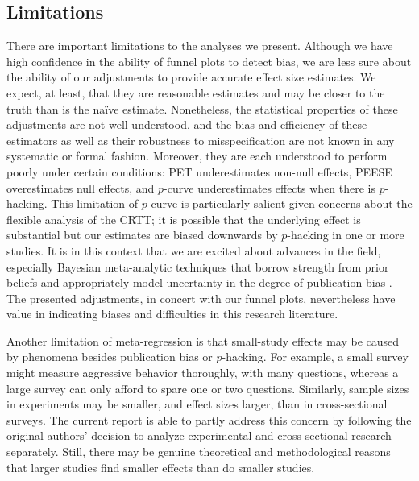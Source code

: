\documentclass[man, mask]{apa6}
\begin{document}
\subsection{Limitations}
There are important limitations to the analyses we present.  Although we have high confidence in the ability of funnel plots to detect bias, we are less sure about the ability of our adjustments to provide accurate effect size estimates.  We expect, at least, that they are reasonable estimates and may be closer to the truth than is the na{\"i}ve estimate.  Nonetheless, the statistical properties of these adjustments are not well understood, and the bias and efficiency of these estimators as well as their robustness to misspecification are not known in any systematic or formal fashion.  Moreover, they are each understood to perform poorly under certain conditions: PET underestimates non-null effects, PEESE overestimates null effects, and $p$-curve underestimates effects when there is $p$-hacking. This limitation of $p$-curve is particularly salient given concerns about the flexible analysis of the CRTT; it is possible that the underlying effect is substantial but our estimates are biased downwards by $p$-hacking in one or more studies.  It is in this context that we are excited about advances in the field, especially Bayesian meta-analytic techniques that borrow strength from prior beliefs and appropriately model uncertainty in the degree of publication bias \citep{Guan:Vandekerckhove:2015}. The presented adjustments, in concert with our funnel plots, nevertheless have value in indicating biases and difficulties in this research literature. 

Another limitation of meta-regression is that small-study effects may be caused by phenomena besides publication bias or $p$-hacking. For example, a small survey might measure aggressive behavior thoroughly, with many questions, whereas a large survey can only afford to spare one or two questions. Similarly, sample sizes in experiments may be smaller, and effect sizes larger, than in cross-sectional surveys. The current report is able to partly address this concern by following the original authors' decision to analyze experimental and cross-sectional research separately. Still, there may be genuine theoretical and methodological reasons that larger studies find smaller effects than do smaller studies. %
\end{document}
